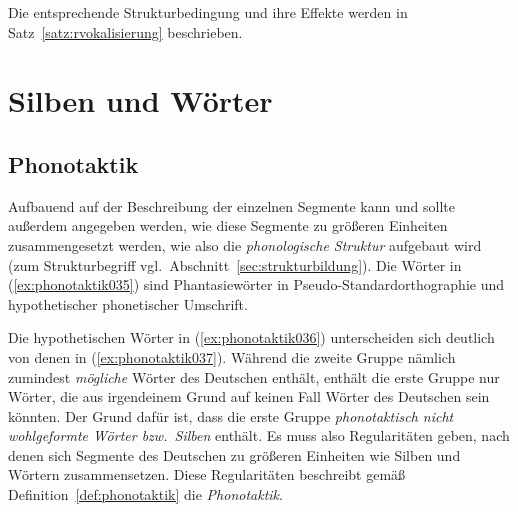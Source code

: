 Die entsprechende Strukturbedingung und ihre Effekte werden in Satz~\ref{satz:rvokalisierung} beschrieben.



\section{Silben und Wörter}
\label{sec:silbenundwoerter}

\subsection{Phonotaktik}
\label{sec:phonotaktik}

Aufbauend auf der Beschreibung der einzelnen Segmente kann und sollte außerdem angegeben werden, wie diese Segmente zu größeren Einheiten zusammengesetzt werden, wie also die \textit{phonologische Struktur} aufgebaut wird (zum Strukturbegriff vgl.\ Abschnitt~\ref{sec:strukturbildung}).
Die Wörter in (\ref{ex:phonotaktik035}) sind Phantasiewörter in Pseudo-Standardorthographie und hypothetischer phonetischer Umschrift.

\begin{exe}
  \ex\label{ex:phonotaktik035}
  \begin{xlist}
  \end{xlist}
\end{exe}

Die hypothetischen Wörter in (\ref{ex:phonotaktik036}) unterscheiden sich deutlich von denen in (\ref{ex:phonotaktik037}).
Während die zweite Gruppe nämlich zumindest \textit{mögliche} Wörter des Deutschen enthält, enthält die erste Gruppe nur Wörter, die aus irgendeinem Grund auf keinen Fall Wörter des Deutschen sein könnten.
Der Grund dafür ist, dass die erste Gruppe \textit{phonotaktisch nicht wohlgeformte Wörter bzw.\ Silben} enthält.
Es muss also Regularitäten geben, nach denen sich Segmente des Deutschen zu größeren Einheiten wie Silben und Wörtern zusammensetzen.
Diese Regularitäten beschreibt gemäß Definition~\ref{def:phonotaktik} die \textit{Phonotaktik}.

